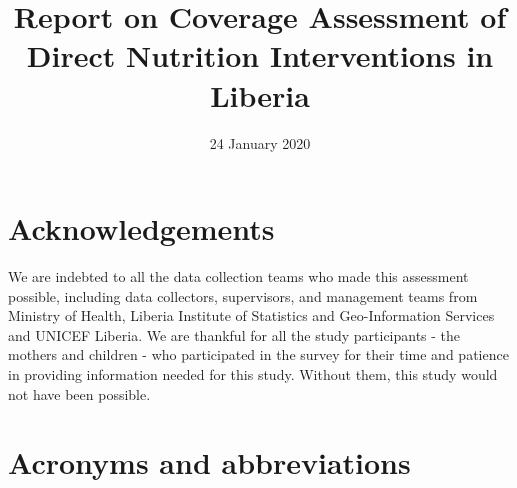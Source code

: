 \documentclass[12pt,a4paper]{article}
\title{Report on Coverage Assessment of Direct Nutrition Interventions in Liberia}
\author{}
\date{\vspace{-2.5em}24 January 2020}
\begin{document}
\maketitle

\pagebreak 


{
\hypersetup{linkcolor=}
\setcounter{tocdepth}{3}
\tableofcontents
}
\listoftables
\listoffigures
\newpage

\hypertarget{acknowledgements}{%
\section*{Acknowledgements}\label{acknowledgements}}

We are indebted to all the data collection teams who made this assessment possible, including data collectors, supervisors, and management teams from Ministry of Health, Liberia Institute of Statistics and Geo-Information Services and UNICEF Liberia. We are thankful for all the study participants - the mothers and children - who participated in the survey for their time and patience in providing information needed for this study. Without them, this study would not have been possible.

\newpage

\hypertarget{acronyms-and-abbreviations}{%
\section*{Acronyms and abbreviations}\label{acronyms-and-abbreviations}}
\end{document}
